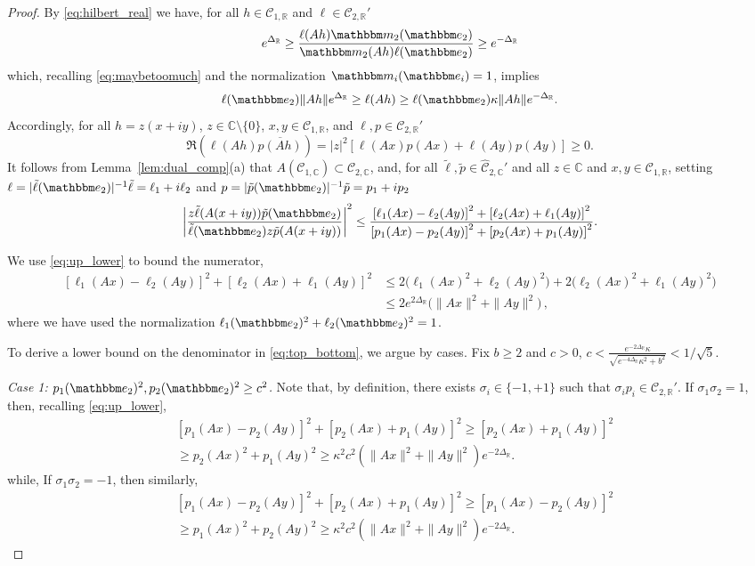 \documentclass{amsart}
\numberwithin{equation}{section}
\newcommand\cC{{\mathcal C}}
\newcommand\bC{{\mathbb C}}
\newcommand\bR{{\mathbb R}}
\newcommand{\bbe}{\mathbbm e}
\newcommand{\bbm}{\mathbbm m}
\begin{document}
\begin{proof}
By \eqref{eq:hilbert_real} we have, for all $h\in\cC_{1,\bR}$ and $\ell\in\cC_{2,\bR}'$
\[
e^{\Delta_\bR}\geq \frac{\ell(Ah)\bbm_2(\bbe_2)}{\bbm_2(Ah)\ell(\bbe_2)}\geq e^{-\Delta_\bR}
\]
which, recalling \eqref{eq:maybetoomuch} and the normalization $\bbm_i(\bbe_i)  =1$, implies
\begin{equation}\label{eq:up_lower}
\ell(\bbe_2)\|Ah\|e^{\Delta_{\bR}}\geq \ell(Ah)\geq \ell(\bbe_2)\kappa\|Ah\|e^{-\Delta_{\bR}}.
\end{equation}
Accordingly, for all $h=z(x+iy)$, $z\in \bC\setminus\{0\}$, $x,y \in \cC_{1,\bR}$, and $\ell,p\in \cC_{2,\bR}'$
\[
\Re(\ell(A h)\overline{p(Ah)})=|z|^2\left[\ell(Ax)p(Ax)+\ell(Ay)p(Ay)\right]\geq 0.
\]
It follows from Lemma~\ref{lem:dual_comp}(a) that $A(\cC_{1,\bC})\subset \cC_{2,\bC}$, and, for all $\tilde\ell, \tilde p\in \hat \cC_{2,\bC}'$
and all $z\in\bC$ and $x,y \in \cC_{1,\bR}$, setting $\ell=|\tilde\ell(\bbe_2)|^{-1}\tilde\ell=\ell_1+i\ell_2$ and $p=|\tilde p(\bbe_2)|^{-1}\tilde p=p_1+ip_2$
\begin{equation}
\label{eq:top_bottom}
\left|\frac{z\tilde\ell(A(x+iy))\tilde p(\bbe_2)}{\tilde\ell(\bbe_2)z\tilde p(A(x+iy))}\right|^2\leq
\frac{\left[\ell_1(Ax)-\ell_2(Ay)\right]^2+\left[\ell_2(Ax)+\ell_1(Ay)\right]^2}
{\left[p_1(Ax)-p_2(Ay)\right]^2+\left[p_2(Ax)+p_1(Ay)\right]^2}.
\end{equation}

We use \eqref{eq:up_lower} to bound the numerator,
\[
\begin{split}
\left[\ell_1(Ax)-\ell_2(Ay)\right]^2+\left[\ell_2(Ax)+\ell_1(Ay)\right]^2
& \le 2 \big( \ell_1(Ax)^2 + \ell_2(Ay)^2  \big)+ 2 \big(\ell_2(Ax)^2+\ell_1(Ay)^2 \big) \\
& \le 2 e^{2 \Delta_\bR} \big( \|Ax\|^2 + \| Ay \|^2 \big) \, ,
\end{split}
\]
where we have used the normalization $\ell_1(\bbe_2)^2 + \ell_2(\bbe_2)^2 = 1$.

To derive a lower bound on the denominator in \eqref{eq:top_bottom}, we argue by cases.
Fix $b \ge 2$ and $c>0$, $c < \frac{e^{-2\Delta_{\bR}} \kappa}{\sqrt{e^{-4 \Delta_{\bR}} \kappa^2 + b^2} } < 1/\sqrt{5}$.

\medskip
\noindent
{\em Case 1: $p_1(\bbe_2)^2, p_2(\bbe_2)^2 \ge c^2$.}
Note that, by definition, there exists $\sigma_i\in\{-1,+1\}$ such that $\sigma_i p_i\in\cC_{2,\bR}'$. 
If $\sigma_1\sigma_2=1$, then, recalling \eqref{eq:up_lower}, 
\[
\begin{split}
&\left[p_1(Ax)-p_2(Ay)\right]^2+\left[p_2(Ax)+p_1(Ay)\right]^2\geq \left[p_2(Ax)+p_1(Ay)\right]^2\\
&\geq p_2(Ax)^2+p_1(Ay)^2\geq \kappa^2 c^2 (\|Ax\|^2  + \|Ay\|^2 ) e^{-2\Delta_{\bR}}.
\end{split}
\]
while, If $\sigma_1\sigma_2=-1$, then similarly,
\[
\begin{split}
&\left[p_1(Ax)-p_2(Ay)\right]^2+\left[p_2(Ax)+p_1(Ay)\right]^2\geq \left[p_1(Ax)-p_2(Ay)\right]^2\\
&\geq p_1(Ax)^2+p_2(Ay)^2\geq \kappa^2 c^2 (\|Ax\|^2  + \|Ay\|^2  ) e^{-2\Delta_{\bR}}.
\end{split}
\]


\end{proof}
\end{document}
